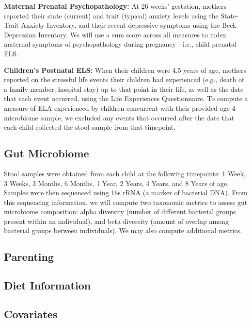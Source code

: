 \documentclass[
]{book}
\begin{document}
\textbf{Maternal Prenatal Psychopathology:} At 26 weeks' gestation, mothers reported their state (current) and trait (typical) anxiety levels using the State-Trait Anxiety Inventory, and their recent depressive symptoms using the Beck Depression Inventory. We will use a sum score across all measures to index maternal symptoms of psychopathology during pregnancy - i.e., child prenatal ELS.

\textbf{Children's Postnatal ELS:} When their children were 4.5 years of age, mothers reported on the stressful life events their children had experienced (e.g., death of a family member, hospital stay) up to that point in their life, as well as the date that each event occurred, using the Life Experiences Questionnaire. To compute a measure of ELA experienced by children concurrent with their provided age 4 microbiome sample, we excluded any events that occurred after the date that each child collected the stool sample from that timepoint.

\hypertarget{gut-microbiome}{%
\subsection{Gut Microbiome}\label{gut-microbiome}}

Stool samples were obtained from each child at the following timepoints: 1 Week, 3 Weeks, 3 Months, 6 Months, 1 Year, 2 Years, 4 Years, and 8 Years of age. Samples were then sequenced using 16s rRNA (a marker of bacterial DNA). From this sequencing information, we will compute two taxonomic metrics to assess gut microbiome composition: alpha diversity (number of different bacterial groups present within an individual), and beta diversity (amount of overlap among bacterial groups between individuals). We may also compute additional metrics.

\hypertarget{parenting}{%
\subsection{Parenting}\label{parenting}}

\hypertarget{diet-information}{%
\subsection{Diet Information}\label{diet-information}}

\hypertarget{covariates}{%
\subsection{Covariates}\label{covariates}}
\end{document}
